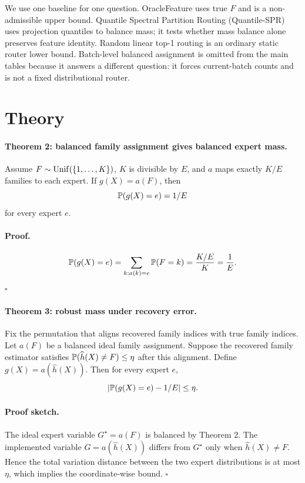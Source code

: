 \documentclass{article}
\begin{document}
We use one baseline for one question.  OracleFeature uses true \(F\) and is a
non-admissible upper bound.  Quantile Spectral Partition Routing (Quantile-SPR)
uses projection quantiles to balance mass; it tests whether mass balance alone
preserves feature identity.  Random linear top-1 routing is an ordinary static
router lower bound.  Batch-level balanced assignment is omitted from the main
tables because it answers a different question: it forces current-batch counts
and is not a fixed distributional router.

\section{Theory}

\paragraph{Theorem 2: balanced family assignment gives balanced expert mass.}
Assume \(F\sim\mathrm{Unif}(\{1,\ldots,K\})\), \(K\) is divisible by \(E\), and
\(a\) maps exactly \(K/E\) families to each expert.  If \(g(X)=a(F)\), then
\[
    \mathbb{P}(g(X)=e)=1/E
\]
for every expert \(e\).

\paragraph{Proof.}
\[
    \mathbb{P}(g(X)=e)
    =
    \sum_{k:a(k)=e}\mathbb{P}(F=k)
    =
    \frac{K/E}{K}
    =
    \frac1E.
\]
\hfill\(\square\)

\paragraph{Theorem 3: robust mass under recovery error.}
Fix the permutation that aligns recovered family indices with true family
indices.  Let \(a(F)\) be a balanced ideal family assignment.  Suppose the
recovered family estimator satisfies \(\mathbb{P}(\widehat h(X)\neq F)\leq\eta\)
after this alignment.  Define \(g(X)=a(\widehat h(X))\).  Then for every expert
\(e\),
\begin{equation}
    \left\lvert \mathbb{P}(g(X)=e)-1/E \right\rvert\leq\eta.
\end{equation}

\paragraph{Proof sketch.}
The ideal expert variable \(G^\star=a(F)\) is balanced by Theorem 2.  The
implemented variable \(G=a(\widehat h(X))\) differs from \(G^\star\) only when
\(\widehat h(X)\neq F\).  Hence the total variation distance between the two
expert distributions is at most \(\eta\), which implies the coordinate-wise
bound.
\hfill\(\square\)
\end{document}
